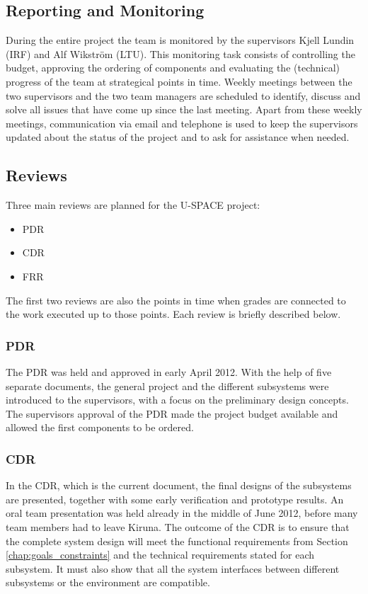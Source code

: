 \subsection{Reporting and Monitoring}
%
During the entire project the team is monitored by the supervisors Kjell Lundin (\ac{IRF}) and Alf Wikström (\ac{LTU}). This monitoring task consists of controlling the budget, approving the ordering of components and evaluating the (technical) progress of the team at strategical points in time. Weekly meetings between the two supervisors and the two team managers are scheduled to identify, discuss and solve all issues that have come up since the last meeting. Apart from these weekly meetings, communication via email and telephone is used to keep the supervisors updated about the status of the project and to ask for assistance when needed.
%
\subsection{Reviews}
%
Three main reviews are planned for the \ac{U-SPACE} project:
%
\begin{itemize}
\item \acl{PDR}
\item \acl{CDR}
\item \acl{FRR}
\end{itemize}
%
The first two reviews are also the points in time when grades are connected to the work executed up to those points. Each review is briefly described below.
%
\subsubsection*{\acl{PDR}}
The \ac{PDR} was held and approved in early April 2012. With the help of five separate documents, the general project and the different subsystems were introduced to the supervisors, with a focus on the preliminary design concepts. The supervisors approval of the \ac{PDR} made the project budget available and allowed the first components to be ordered.
%
\subsubsection*{\acl{CDR}}
In the \ac{CDR}, which is the current document, the final designs of the subsystems are presented, together with some early verification and prototype results. An oral team presentation was held already in the middle of June 2012, before many team members had to leave Kiruna. The outcome of the \ac{CDR} is to ensure that the complete system design will meet the functional requirements from Section \ref{chap:goals_constraints} and the technical requirements stated for each subsystem. It must also show that all the system interfaces between different subsystems or the environment are compatible.
%
